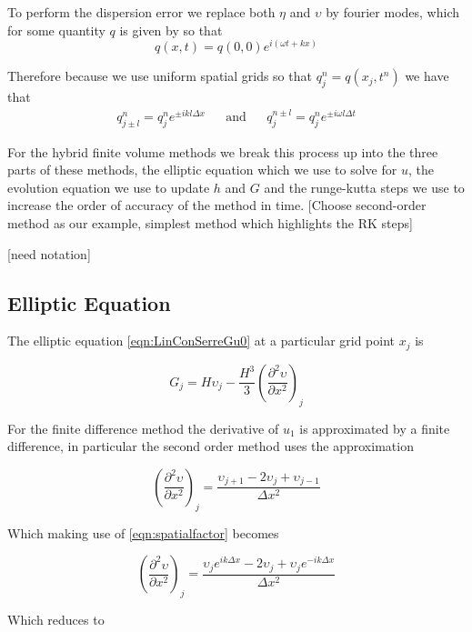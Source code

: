 To perform the dispersion error we replace both $\eta$ and $\upsilon$ by fourier modes, which for some quantity $q$ is given by so that
\begin{equation}
q(x,t) = q(0,0) e^{i\left(\omega t + kx\right)}
\label{eqn:FourierNode}
\end{equation}


Therefore because we use uniform spatial grids so that $q^n_j = q(x_j,t^n)$  we have that
\begin{align}
q^{n}_{j \pm l} = q^n_j e^{\pm ik l\Delta x} & & \text{and} & & q^{n \pm l}_{j} = q^n_j e^{\pm i \omega l\Delta t}
\label{eqn:fourierfactor}
\end{align}



For the hybrid finite volume methods we break this process up into the three parts of these methods, the elliptic equation which we use to solve for $u$, the evolution equation we use to update $h$ and $G$ and the runge-kutta steps we use to increase the order of accuracy of the method in time.   [Choose second-order method as our example, simplest method which highlights the RK steps]


[need notation]

\subsection{Elliptic Equation}
The elliptic equation \eqref{eqn:LinConSerreGu0} at a particular grid point $x_j$ is

\[G_j = H\upsilon_j -\frac{H^3}{3} \left(\frac{\partial^2 \upsilon}{\partial x^2}\right)_j\]

For the finite difference method the derivative of $u_1$ is approximated by a finite difference, in particular the second order method uses the approximation  

\[ \left(\frac{\partial^2 \upsilon}{\partial x^2}\right)_j = \frac{\upsilon_{j+1} - 2\upsilon_{j} + \upsilon_{j-1}}{\Delta x^2}\]

Which making use of \eqref{eqn:spatialfactor} becomes

\[ \left(\frac{\partial^2 \upsilon}{\partial x^2}\right)_j = \frac{\upsilon_{j} e^{ik\Delta x} - 2\upsilon_{j} + \upsilon_{j}e^{-ik\Delta x}}{\Delta x^2}\]

Which reduces to

